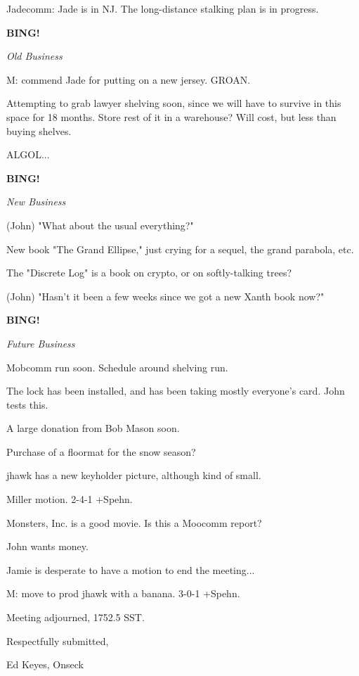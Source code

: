 \documentclass[12pt]{article}
\newcommand{\bing}{{\bf BING!} }
\newcommand{\goto}[1]{\bing \vskip 12pt \centerline{{\em{#1}}}}
\begin{document}
Jadecomm: Jade is in NJ. The long-distance stalking plan is in progress.

\goto{Old Business}

M: commend Jade for putting on a new jersey. GROAN.

Attempting to grab lawyer shelving soon, since we will have to survive in this space for 18 months. Store rest of it in a warehouse? Will cost, but less than buying shelves.

ALGOL...

\goto{New Business}

(John) "What about the usual everything?"

New book "The Grand Ellipse," just crying for a sequel, the grand parabola, etc.

The "Discrete Log" is a book on crypto, or on softly-talking trees?

(John) "Hasn't it been a few weeks since we got a new Xanth book now?"

\goto{Future Business}

Mobcomm run soon. Schedule around shelving run.

The lock has been installed, and has been taking mostly everyone's card. John tests this.

A large donation from Bob Mason soon.

Purchase of a floormat for the snow season?

jhawk has a new keyholder picture, although kind of small.

Miller motion. 2-4-1 +Spehn.

Monsters, Inc. is a good movie. Is this a Moocomm report?

John wants money.

Jamie is desperate to have a motion to end the meeting...

M: move to prod jhawk with a banana. 3-0-1 +Spehn.

\vspace{12pt}

\noindent
Meeting adjourned, 1752.5 SST.

\vspace{18pt}

\centerline{Respectfully submitted,}
\centerline{Ed Keyes, Onseck}
\end{document}
